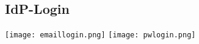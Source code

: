 \subsection{IdP-Login}
\label{sec:Anhang:IdP-Login}
\texttt{[image: emaillogin.png]}
\texttt{[image: pwlogin.png]}